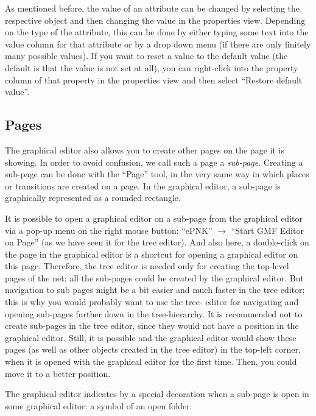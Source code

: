 As mentioned before, the value of an attribute can be changed by selecting the
respective object and then changing the value in the properties view.
Depending on the type of the attribute, this can be done by either typing
some text into the value column for that attribute or by a drop down menu
(if there are only finitely many possible values). If you want to reset
a value to the default value (the default is that the value is not set at all),
you can right-click into the property column of that property in the properties
view and then select ``Restore default value''.%

\subsection{Pages}
\label{subsec:sub-pages}

The graphical editor also allows you to create other pages on the
page it is showing. In order to avoid confusion, we call such
a page a \emph{sub-page}.%
Creating a sub-page
can be done with the ``Page'' tool, in the very same way in which
places or transitions are created on a page. In the graphical editor,
a sub-page is graphically represented as a rounded rectangle. 

It is possible to open a graphical editor on a sub-page from the
graphical editor via a pop-up menu on the right mouse button: ``ePNK''
$\rightarrow$ ``Start GMF Editor on Page'' (as we have seen it for the tree
editor).
And also here, a double-click on the page in the graphical editor is
a shortcut for opening a graphical editor on this page.
Therefore, the tree editor is needed only for creating the top-level
pages of the net; all the sub-pages could be created by the
graphical editor. But navigation to sub pages might be a bit easier
and much faster in the tree editor; this is why you would probably want to use
the tree- editor for navigating and opening sub-pages further down in the
tree-hierarchy. It is recommended not to create sub-pages in the tree editor,
since they would not have a position in the graphical editor. Still, it is
possible and the graphical editor would show these pages (as well as other
objects created in the tree editor) in the top-left corner, when it is opened
with the graphical editor for the first time. Then, you could move it to
a better position.

The graphical editor indicates by a special decoration when a sub-page is
open in some graphical editor: a symbol of an open folder.

